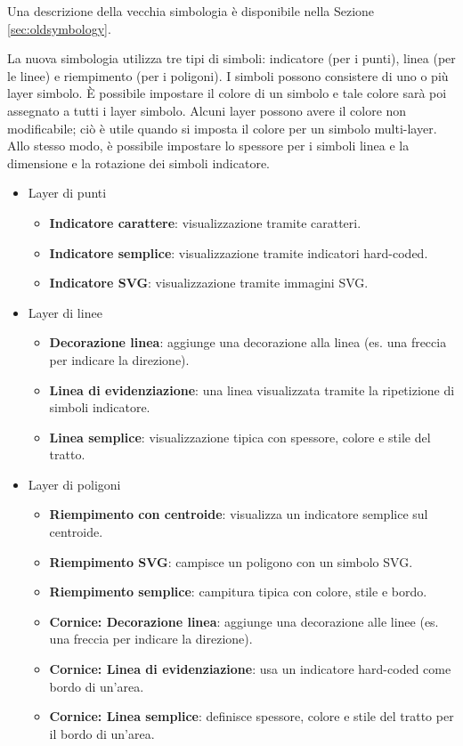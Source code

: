 Una descrizione della vecchia simbologia è disponibile nella Sezione \ref{sec:oldsymbology}.


La nuova simbologia utilizza tre tipi di simboli: indicatore (per i punti), linea (per le linee) 
e riempimento (per i poligoni). I simboli possono consistere di uno o più layer 
simbolo. È possibile impostare il colore di un simbolo e tale colore sarà poi assegnato a 
tutti i layer simbolo. Alcuni layer possono avere il colore non modificabile; ciò è utile 
quando si imposta il colore per un simbolo multi-layer. Allo stesso modo, è possibile impostare 
lo spessore per i simboli linea e la dimensione e la rotazione dei simboli indicatore.
 

\begin{itemize}[label=--]
\item Layer di punti
\begin{itemize}[label=--]
\item \textbf{Indicatore carattere}: visualizzazione tramite caratteri.
\item \textbf{Indicatore semplice}: visualizzazione tramite indicatori hard-coded.
\item \textbf{Indicatore SVG}: visualizzazione tramite immagini SVG.
\end{itemize}
\item Layer di linee 
\begin{itemize}[label=--]
\item \textbf{Decorazione linea}: aggiunge una decorazione alla linea (es. una freccia per indicare la direzione).
\item \textbf{Linea di evidenziazione}: una linea visualizzata tramite la ripetizione di simboli indicatore.
\item \textbf{Linea semplice}: visualizzazione tipica con spessore, colore e stile del tratto.
\end{itemize}
\item Layer di poligoni
\begin{itemize}[label=--]
\item \textbf{Riempimento con centroide}: visualizza un indicatore semplice sul centroide.
\item \textbf{Riempimento SVG}: campisce un poligono con un simbolo SVG. 
\item \textbf{Riempimento semplice}: campitura tipica con colore, stile e bordo.
\item \textbf{Cornice: Decorazione linea}: aggiunge una decorazione alle linee (es. una freccia per indicare la direzione).
\item \textbf{Cornice: Linea di evidenziazione}: usa un indicatore hard-coded come bordo di un'area.
\item \textbf{Cornice: Linea semplice}: definisce spessore, colore e stile del tratto per il bordo di un'area.
\end{itemize}
\end{itemize}


